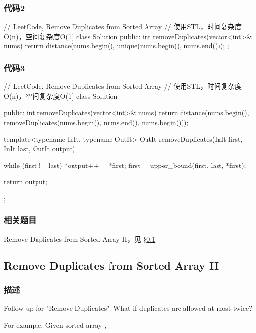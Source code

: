 \subsubsection{代码2}
\begin{Code}
// LeetCode, Remove Duplicates from Sorted Array
// 使用STL，时间复杂度O(n)，空间复杂度O(1)
class Solution {
public:
    int removeDuplicates(vector<int>& nums) {
        return distance(nums.begin(), unique(nums.begin(), nums.end()));
    }
};
\end{Code}


\subsubsection{代码3}
\begin{Code}
// LeetCode, Remove Duplicates from Sorted Array
// 使用STL，时间复杂度O(n)，空间复杂度O(1)
class Solution {
public:
    int removeDuplicates(vector<int>& nums) {
        return distance(nums.begin(), removeDuplicates(nums.begin(), nums.end(), nums.begin()));
    }

    template<typename InIt, typename OutIt>
    OutIt removeDuplicates(InIt first, InIt last, OutIt output) {
        while (first != last) {
            *output++ = *first;
            first = upper_bound(first, last, *first);
        }

        return output;
    }
};
\end{Code}


\subsubsection{相关题目}

\begindot
\item Remove Duplicates from Sorted Array II，见 \S \ref{sec:remove-duplicates-from-sorted-array-ii}
\myenddot


\subsection{Remove Duplicates from Sorted Array II}
\label{sec:remove-duplicates-from-sorted-array-ii}


\subsubsection{描述}
Follow up for "Remove Duplicates":
What if duplicates are allowed at most twice?

For example,
Given sorted array ,

